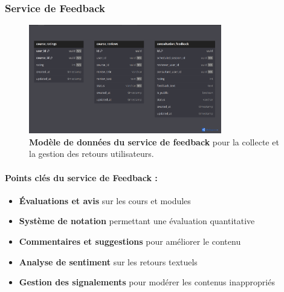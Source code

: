 \subsubsection{Service de Feedback}
\begin{figure}[H]
  \centering
  \includegraphics[width=0.75\textwidth,keepaspectratio]{week_1_img/services_db_screanshots/Screenshot 2025-06-06 at 15-08-00 Feedback_Service.pdf.png}
  \caption{\textbf{Modèle de données du service de feedback} pour la collecte et la gestion des retours utilisateurs.}
  \label{fig:feedback_service}
\end{figure}

\small
\paragraph{Points clés du service de Feedback :}
\begin{itemize}[leftmargin=*,noitemsep,topsep=0pt]
  \item \textbf{Évaluations et avis} sur les cours et modules
  \item \textbf{Système de notation} permettant une évaluation quantitative
  \item \textbf{Commentaires et suggestions} pour améliorer le contenu
  \item \textbf{Analyse de sentiment} sur les retours textuels
  \item \textbf{Gestion des signalements} pour modérer les contenus inappropriés
\end{itemize}
\normalsize

